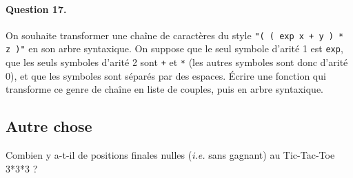 \documentclass[10pt,a4paper]{article}
\begin{document}
\paragraph{Question 17.} On souhaite transformer une chaîne de caractères du style
\texttt{"( ( exp x + y ) * z )"} en son arbre syntaxique. On suppose que le seul
symbole d'arité 1 est \texttt{exp}, que les seuls symboles d'arité 2 sont \texttt{+}
et \texttt{*} (les autres symboles sont donc d'arité 0), et que les symboles sont séparés
par des espaces. Écrire une fonction qui transforme ce genre de chaîne en liste de
couples, puis en arbre syntaxique.
\subsection{Autre chose}
Combien y a-t-il de positions finales nulles (\textit{i.e.} sans gagnant) au Tic-Tac-Toe 3*3*3 ?
\end{document}
